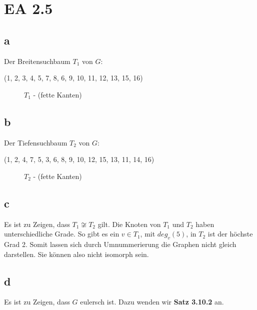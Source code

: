 \documentclass[12pt]{article}
\begin{document}
\section*{EA 2.5}
\subsection*{a}
Der Breitensuchbaum $T_1$ von $G$:

(1, 2, 3, 4, 5, 7, 8, 6, 9, 10, 11, 12, 13, 15, 16)

\begin{figure}[h]
	\centering
     \scalebox{.5}{}
	\caption{$T_1$ - (fette Kanten)}
	\label{img:grafik-dmm}
\end{figure}


\subsection*{b}
Der Tiefensuchbaum $T_2$ von $G$:

(1, 2, 4, 7, 5, 3, 6, 8, 9, 10, 12, 15, 13, 11, 14, 16)

\begin{figure}[h]
	\centering
	\scalebox{.5}{}
	\caption{$T_2$ - (fette Kanten)} 
	\label{img:grafi-dmm}
\end{figure}

\subsection*{c}
Es ist zu Zeigen, dass $T_1 \not\cong T_2$ gilt. Die Knoten von $T_1$ und $T_2$ haben unterschiedliche
Grade. So gibt es ein $v \in T_1$, mit $deg_{v}(5)$, in $T_2$ ist der höchste Grad 2. Somit lassen
sich durch Umnummerierung die Graphen nicht gleich darstellen. Sie können also nicht isomorph sein.


\subsection*{d}
Es ist zu Zeigen, dass $G$ eulersch ist. Dazu wenden wir \textbf{Satz 3.10.2} an.
\\
\end{document}

